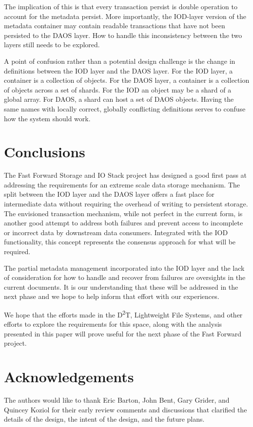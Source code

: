 \documentclass[conference]{IEEEtran}
\newcommand{\DDTns}{D\textsuperscript{2}T}
\begin{document}
The implication of this is that every transaction persist is double operation
to account for the metadata persist. More importantly, the IOD-layer version of
the metadata container may contain readable transactions that have not been
persisted to the DAOS layer. How to handle this inconsistency between the two
layers still needs to be explored.

A point of confusion rather than a potential design challenge is the change in
definitions between the IOD layer and the DAOS layer.  For the IOD layer, a
container is a collection of objects. For the DAOS layer, a container is a
collection of objects across a set of shards. For the IOD an object may be a
shard of a global array.  For DAOS, a shard can host a set of DAOS objects.
Having the same names with locally correct, globally conflicting definitions
serves to confuse how the system should work.

\section{Conclusions}
\label{sec:conclusion}

The Fast Forward Storage and IO Stack project has designed a good first pass at
addressing the requirements for an extreme scale data storage mechanism. The
split between the IOD layer and the DAOS layer offers a fast place for
intermediate data without requiring the overhead of writing to persistent
storage. The envisioned transaction mechanism, while not perfect in the current
form, is another good attempt to address both failures and prevent access to
incomplete or incorrect data by downstream data consumers. Integrated with the
IOD functionality, this concept represents the consensus approach for what will
be required.

The partial metadata management incorporated into the IOD layer and the lack of
consideration for how to handle and recover from failures are oversights in the
current documents. It is our understanding that these will be addressed in the
next phase and we hope to help inform that effort with our experiences.

We hope that the efforts made in the \DDTns, Lightweight File Systems, and
other efforts to explore the requirements for this space, along with the
analysis presented in this paper will prove useful for the next phase of the
Fast Forward project.

\section{Acknowledgements}
The authors would like to thank Eric Barton, John Bent, Gary Grider, and
Quincey Koziol for their early review comments and discussions that clarified
the details of the design, the intent of the design, and the future plans.
\end{document}
